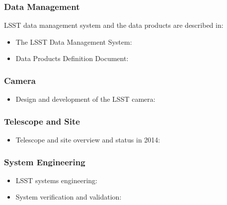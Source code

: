 \subsubsection{Data Management}

LSST data management system and the data products are described in:

\begin{itemize}
  \item The LSST Data Management System: \cite{2015arXiv151207914J}
  \item Data Products Definition Document: \cite{LSE-163}
\end{itemize}


\subsubsection{Camera}

\begin{itemize}
   \item Design and development of the LSST camera: \cite{2010SPIE.7735E..0JK}
\end{itemize}


\subsubsection{Telescope and Site}

\begin{itemize}
   \item Telescope and site overview and status in 2014:  \cite{2014SPIE.9145E..1AG}
\end{itemize}

\subsubsection{System Engineering}

\begin{itemize}
   \item LSST systems engineering: \cite{2014SPIE.9150E..0MC}
   \item System verification and validation: \cite{2014SPIE.9150E..0NS}
\end{itemize}
%


